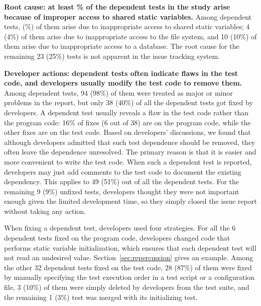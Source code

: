 
\vspace{1mm}
\noindent \textbf{{Root cause: at least \svratio\% of the dependent tests
in the study arise because of improper access to shared static
variables.}} Among \dtnum dependent tests, \svnum (\svratio\%) of them
arise due to inappropriate access to
shared static variables; 4 (4\%) of them arise
due to inappropriate access to the file system, and 10 (10\%) of them arise
due to inappropriate access to a database.
The root cause for the remaining 23 (25\%) tests is not apparent
in the issue tracking system.

\vspace{1mm}
\noindent \textbf{{Developer actions: dependent tests
often indicate flaws in the test code, and developers usually
modify the test code to remove them.}}
Among \dtnum dependent tests,
94 (98\%) of them were treated as major or minor problems in the report,
but only 38 (40\%) of all the \dtnum dependent tests
got fixed by developers. 
A dependent test usually
reveals a flaw in the test code rather than the program code:
16\% of fixes (6 out of 38) are
on the program code, while the other fixes are on the
test code.
Based on developers' discussions, we found that although
developers admitted that such test dependence should be removed,
they often leave the dependence unresolved.
The primary reason is that
it is
easier and more convenient to write the test code. When such a dependent
test is reported, developers may just add comments to the test code
to document the existing dependency. This applies to 49 (51\%) out
of all the \dtnum dependent tests. For the remaining 9 (9\%) unfixed tests,
developers thought they were not important enough given the limited
development time, so they simply closed the issue report without taking
any action.


When fixing a dependent test, developers used
four strategies. For all the 6 dependent tests
fixed on the program code, developers changed
code that performs static variable initialization, which ensures that
each dependent test will not read an undesired value.
Section~\ref{sec:repercussion} gives an example.
Among the other 32 dependent tests fixed on the test code,
28 (87\%) of them were fixed by manually specifying
the test execution order in a test script or a configuration file,
3 (10\%) of them were simply deleted by developers
from the test suite, and the remaining 1 (3\%) test was merged with its
initializing test.



